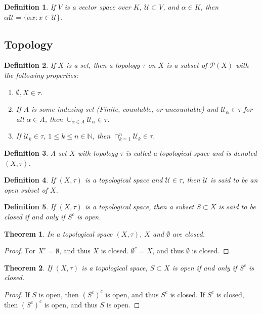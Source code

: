 \documentclass[oneside]{book}
\theoremstyle{mystyle}
\newtheorem{theorem}{Theorem}[section]
\newtheorem{definition}{Definition}[section]
\begin{document}
\begin{definition}
If $V$ is a vector space over $K$, $\mathcal{U}\subset V$, and $\alpha \in K$, then $\alpha \mathcal{U} = \{\alpha x:x\in \mathcal{U}\}$.
\end{definition}
%
\subsection{Topology}
%
\begin{definition}
If $X$ is a set, then a topology $\tau$ on $X$ is a subset of $\mathcal{P}(X)$ with the following properties:
\begin{enumerate}
\item $\emptyset, X\in \tau$.
\item If $A$ is some indexing set (Finite, countable, or uncountable) and $\mathcal{U}_\alpha \in \tau$ for all $\alpha \in A$, then $\cup_{\alpha \in A} \mathcal{U}_{\alpha} \in \tau$.
\item If $\mathcal{U}_k\in \tau$, $1\leq k \leq n\in \mathbb{N}$, then $\cap_{k=1}^{n}\mathcal{U}_k \in \tau$.
\end{enumerate}
\end{definition}

\begin{definition}
A set $X$ with topology $\tau$ is called a topological space and is denoted $(X,\tau)$.
\end{definition}

\begin{definition}
If $(X,\tau)$ is a topological space and $\mathcal{U}\in \tau$, then $\mathcal{U}$ is said to be an open subset of $X$.
\end{definition}

\begin{definition}
If $(X,\tau)$ is a topological space, then a subset $S\subset X$ is said to be closed if and only if $S^c$ is open.
\end{definition}

\begin{theorem}
In a topological space $(X,\tau)$, $X$ and $\emptyset$ are closed.
\end{theorem}
\begin{proof}
For $X^c = \emptyset$, and thus $X$ is closed. $\emptyset^c=X$, and thus $\emptyset$ is closed.
\end{proof}

\begin{theorem}
If $(X,\tau)$ is a topological space, $S\subset X$ is open if and only if $S^c$ is closed.
\end{theorem}
\begin{proof}
If $S$ is open, then $(S^c)^c$ is open, and thus $S^c$ is closed. If $S^c$ is closed, then $(S^c)^c$ is open, and thus $S$ is open.
\end{proof}
\end{document}
